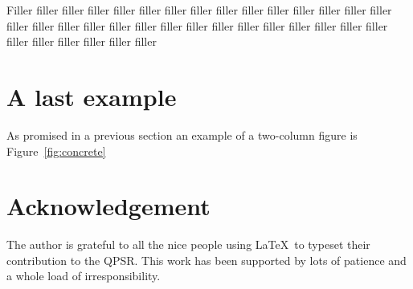 \documentclass{fonetik}
\begin{document}
Filler filler filler filler filler filler filler filler filler
filler filler filler filler filler filler filler filler filler
filler filler filler filler filler filler filler filler filler
filler filler filler filler filler filler filler filler filler

\section{A last example}
As promised in a previous section an example of a
two-column figure is Figure~\ref{fig:concrete}

\section{Acknowledgement}
The author is grateful to all the nice people using \LaTeX\ to typeset
their contribution to the QPSR. This work has been supported by lots
of patience and a whole load of irresponsibility.




\end{document}
